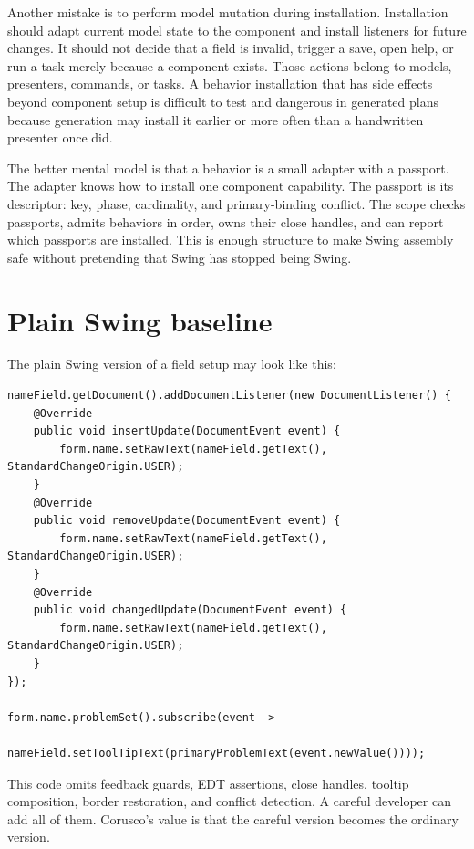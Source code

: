Another mistake is to perform model mutation during installation. Installation
should adapt current model state to the component and install listeners for
future changes. It should not decide that a field is invalid, trigger a save,
open help, or run a task merely because a component exists. Those actions
belong to models, presenters, commands, or tasks. A behavior installation that
has side effects beyond component setup is difficult to test and dangerous in
generated plans because generation may install it earlier or more often than a
handwritten presenter once did.

The better mental model is that a behavior is a small adapter with a passport.
The adapter knows how to install one component capability. The passport is its
descriptor: key, phase, cardinality, and primary-binding conflict. The scope
checks passports, admits behaviors in order, owns their close handles, and can
report which passports are installed. This is enough structure to make Swing
assembly safe without pretending that Swing has stopped being Swing.

\section{Plain Swing baseline}

The plain Swing version of a field setup may look like this:

\begin{lstlisting}[caption={Handwritten field wiring.}]
nameField.getDocument().addDocumentListener(new DocumentListener() {
    @Override
    public void insertUpdate(DocumentEvent event) {
        form.name.setRawText(nameField.getText(), StandardChangeOrigin.USER);
    }
    @Override
    public void removeUpdate(DocumentEvent event) {
        form.name.setRawText(nameField.getText(), StandardChangeOrigin.USER);
    }
    @Override
    public void changedUpdate(DocumentEvent event) {
        form.name.setRawText(nameField.getText(), StandardChangeOrigin.USER);
    }
});

form.name.problemSet().subscribe(event ->
        nameField.setToolTipText(primaryProblemText(event.newValue())));
\end{lstlisting}

This code omits feedback guards, EDT assertions, close handles, tooltip
composition, border restoration, and conflict detection. A careful developer can
add all of them. Corusco's value is that the careful version becomes the
ordinary version.


